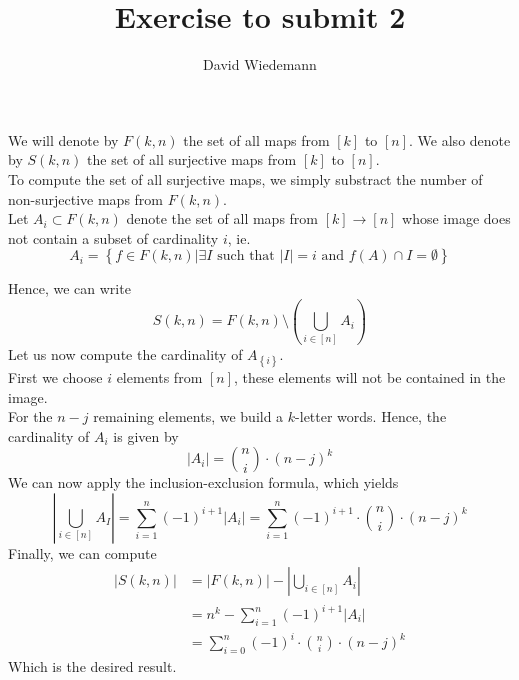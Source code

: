\documentclass[11pt, a4paper, twoside]{article}
\begin{document}
\title{Exercise to submit 2}
\author{David Wiedemann}
\maketitle
We will denote by $F( k,n) $ the set of all maps from $[k]$ to $[n]$.
We also denote by $S( k,n) $ the set of all surjective maps from $[k] $ to $[ n] $.\\
To compute the set of all surjective maps, we simply substract the number of non-surjective maps from $F( k,n) $.\\
Let $A_i\subset F( k,n) $ denote the set of all maps from $[k] \to [ n] $ whose image does not contain a subset of cardinality $i$, ie.
\[ 
	A_i = \left\{ f \in F( k,n) \big| \exists I \text{ such that } |I|=i \text{ and }   f( A) \cap I = \emptyset \right\} 
\]

Hence, we can write 
\[ 
	S( k,n)  = F( k,n) \setminus \left( \bigcup_{i\in [ n] } A_{  i  }  \right) 
\]
Let us now compute the cardinality of $ A_{ \left\{ i \right\} }$.\\
First we choose $i$ elements from $ [ n] $, these elements will not be contained in the image.\\
For the $n-j$ remaining elements, we build a $k$-letter words.
Hence, the cardinality of $A_{  i  } $ is given by
\[ 
	|A_{  i  } | = \binom n i \cdot ( n-j) ^{k}
\]
We can now apply the inclusion-exclusion formula, which yields
\[ 
	\left|\bigcup_{i \in [ n] } A_{  I  }\right| = \sum_{i=1}^{ n} ( -1)^{i+1} |A_i| = \sum_{i=1}^{ n}( -1)^{i+1}\cdot \binom n i \cdot ( n-j)^{k}	
\]
Finally, we can compute
\begin{align*}
	|S( k,n) |&= |F( k,n) | - |\bigcup_{i\in [ n] } A_{  i  } |\\
		  &= n^{k} - \sum_{i=1}^{ n}( -1) ^{i+1}|A_i|\\
		  &= \sum_{i=0}^{ n}( -1) ^{i} \cdot \binom n i \cdot ( n-j)^{k}
\end{align*}
Which is the desired result.
\end{document}
